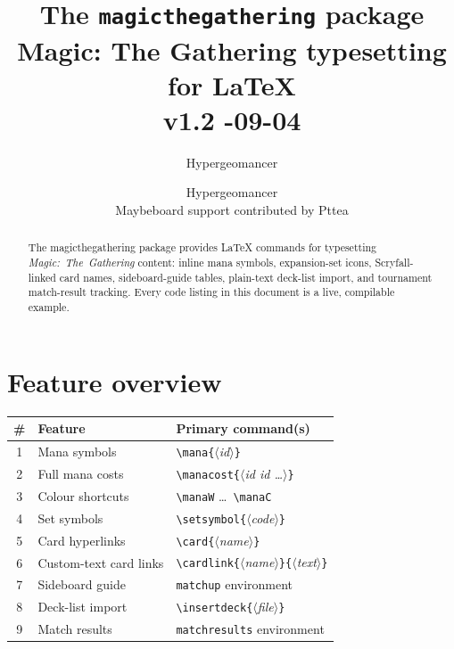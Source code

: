 \documentclass[a4paper,11pt]{article}
\title{%
  {\LARGE\bfseries The \texttt{magicthegathering} package}\\[6pt]
  {\large Magic: The Gathering typesetting for \LaTeX}\\[6pt]
  {\normalsize v1.2 \quad\textbullet\quad 2026-09-04}%
}
\author{Hypergeomancer}
\author{
    Hypergeomancer\\[0.5em]
    \small Maybeboard support contributed by Pttea
}
\date{}
\newcommand{\pkg}[1]{\textsf{#1}}
\newcommand{\env}[1]{\texttt{#1}}
\newcommand{\cmd}[1]{\texttt{\textbackslash#1}}
\newcommand{\meta}[1]{\textnormal{\textit{$\langle$#1$\rangle$}}}
\newcommand{\carg}[1]{\texttt{\{}\meta{#1}\texttt{\}}}
\begin{document}

\maketitle
\thispagestyle{empty}

\begin{abstract}\noindent
The \pkg{magicthegathering} package provides \LaTeX{} commands for typesetting
\emph{Magic:~The~Gathering} content: inline mana symbols,
expansion-set icons, Scryfall-linked card names, sideboard-guide
tables, plain-text deck-list import, and tournament match-result
tracking.  Every code listing in this document is a live,
compilable example.
\end{abstract}

\tableofcontents
\newpage

\section{Feature overview}
\label{sec:features}

\begin{center}
\begin{tabular}{@{} c l l @{}}
  \toprule
  \textbf{\#} & \textbf{Feature} & \textbf{Primary command(s)} \\
  \midrule
  1 & Mana symbols           & \cmd{mana}\carg{id} \\
  2 & Full mana costs        & \cmd{manacost}\carg{id id \ldots} \\
  3 & Colour shortcuts       & \cmd{manaW} \ldots\ \cmd{manaC} \\
  4 & Set symbols            & \cmd{setsymbol}\carg{code} \\
  5 & Card hyperlinks        & \cmd{card}\carg{name} \\
  6 & Custom-text card links & \cmd{cardlink}\carg{name}\carg{text} \\
  7 & Sideboard guide        & \env{matchup} environment \\
  8 & Deck-list import       & \cmd{insertdeck}\carg{file} \\
  9 & Match results          & \env{matchresults} environment \\
  \bottomrule
\end{tabular}
\end{center}
\end{document}
